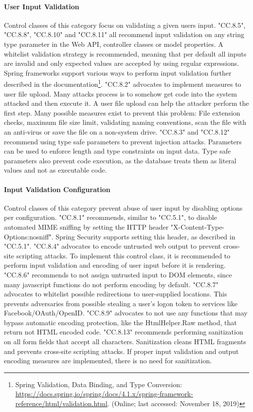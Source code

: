 \paragraph{User Input Validation} Control classes of this category focus on validating a given users input. "CC.8.5", "CC.8.8", "CC.8.10" and "CC.8.11" all recommend input validation on any string type parameter in the Web API, controller classes or model properties. A whitelist validation strategy is recommended, meaning that per default all inputs are invalid and only expected values are accepted by using regular expressions. Spring frameworks support various ways to perform input validation further described in the documentation\footnote{Spring Validation, Data Binding, and Type Conversion: \url{https://docs.spring.io/spring/docs/4.1.x/spring-framework-reference/html/validation.html}. (Online; last accessed:  November 18, 2019)}.
"CC.8.2" advocates to implement measures to user file upload. Many attacks process is to somehow get code into the system attacked and then execute it. A user file upload can help the attacker perform the first step. Many possible measures exist to prevent this problem: File extension checks, maximum file size limit, validating naming conventions, scan the file with an anti-virus or save the file on a non-system drive. "CC.8.3" and "CC.8.12" recommend using type safe parameters to prevent injection attacks. Parameters can be used to enforce length and type constraints on input data. Type safe parameters also prevent code execution, as the database treats them as literal values and not as executable code. \\

\paragraph{Input Validation Configuration} Control classes of this category prevent abuse of user input by disabling options per configuration. "CC.8.1" recommends, similar to "CC.5.1", to disable automated MIME sniffing by setting the HTTP header "X-Content-Type-Options:nosniff". Spring Security supports setting this header, as described in "CC.5.1". "CC.8.4" advocates to encode untrusted web output to prevent cross-site scripting attacks. To implement this control class, it is recommended to perform input validation and encoding of user input before it is rendering. "CC.8.6" recommends to not assign untrusted input to DOM elements, since many javascript functions do not perform encoding by default. "CC.8.7" advocates to whitelist possible redirections to user-supplied locations. This prevents adversaries from possible stealing a user’s logon token to services like Facebook/OAuth/OpenID. "CC.8.9" advocates to not use any functions that may bypass automatic encoding protection, like the HtmlHelper.Raw method, that return not HTML encoded code. "CC.8.13" recommends performing sanitization on all form fields that accept all characters. Sanitization cleans HTML fragments and prevents cross-site scripting attacks. If proper input validation and output encoding measures are implemented, there is no need for sanitization.

